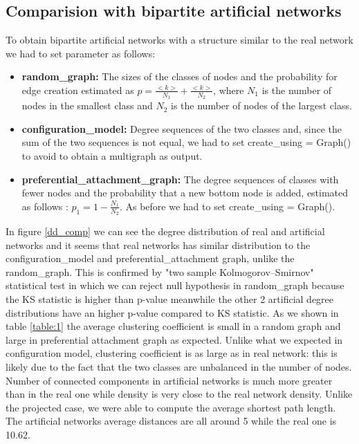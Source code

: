 \documentclass[sigchi]{acmart}
\begin{document}
\subsection{Comparision with bipartite artificial networks}
To obtain bipartite artificial networks with a structure similar to the real network we had to set parameter as follows: 
\begin{itemize}
    \item \textbf{random\_graph: } The sizes of the classes of nodes and the probability for edge creation estimated as \newline $p=\frac{<k>}{N_1}+\frac{<k>}{N_2}$, where $N_1$ is the number of nodes in the smallest class and $N_2$ is the number of nodes of the largest class.
    \item \textbf{configuration\_model: } Degree sequences of the two classes and, since the sum of the two sequences is not equal, we had to set create\_using = Graph() to avoid to obtain a multigraph as output.
    \item \textbf{preferential\_attachment\_graph: } The degree sequences of classes with fewer nodes and the probability that a new bottom node is added, estimated as follows : $p_1=1-\frac{N_1}{N_2}$. As before we had to set create\_using = Graph().
\end{itemize}
In figure \ref{dd_comp} we can see the degree distribution of real and artificial networks and it seems that real networks has similar distribution to the configuration\_model and preferential\_attachment graph, unlike the random\_graph. This is confirmed by "two sample Kolmogorov–Smirnov" statistical test in which we can reject null hypothesis in random\_graph because the KS statistic is higher than p-value meanwhile the other 2 artificial degree distributions have an higher p-value compared to KS statistic. \newline
As we shown in table \ref{table:1} the average clustering coefficient is small in a random graph and large in preferential attachment graph as expected. \newline
Unlike what we expected in configuration model, clustering coefficient is as large as in real network: this is likely due to the fact that the two classes are unbalanced in the number of nodes. \newline
Number of connected components in artificial networks is much more greater than in the real one while density is very close to the real network density. \newline
Unlike the projected case, we were able to compute the average shortest path length. The artificial networks average distances are all around 5 while the real one is 10.62.\newline
\end{document}
